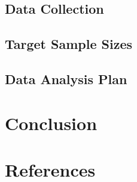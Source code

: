 \documentclass[
]{agujournal2019}
\begin{document}
\subsection{Data Collection}\label{data-collection}

\subsection{Target Sample Sizes}\label{target-sample-sizes}

\subsection{Data Analysis Plan}\label{data-analysis-plan}

\section{Conclusion}\label{conclusion}

\section*{References}\label{references}
\end{document}
